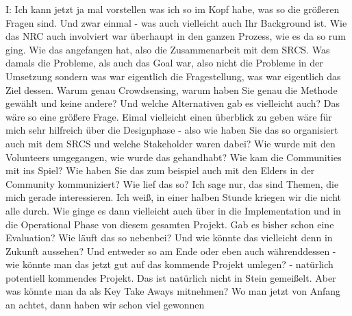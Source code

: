 I: Ich kann jetzt ja mal vorstellen was ich so im Kopf habe, was so die gr{\"o}ßeren Fragen sind. Und zwar einmal - was auch vielleicht auch Ihr Background ist. Wie das NRC auch involviert war {\"u}berhaupt in den ganzen Prozess, wie es da so rum ging. Wie das angefangen hat, also die Zusammenarbeit mit dem SRCS. Was damals die Probleme, als auch das Goal war, also nicht die Probleme in der Umsetzung sondern was war eigentlich die Fragestellung, was war eigentlich das Ziel dessen. Warum genau Crowdsensing, warum haben Sie genau die Methode gew{\"a}hlt und keine andere? Und welche Alternativen gab es vielleicht auch? Das w{\"a}re so eine gr{\"o}ßere Frage. Eimal vielleicht einen {\"u}berblick zu geben w{\"a}re f{\"u}r mich sehr hilfreich {\"u}ber die Designphase - also wie haben Sie das so organisiert auch mit dem SRCS und welche Stakeholder waren dabei? Wie wurde mit den Volunteers umgegangen, wie wurde das gehandhabt? Wie kam die Communities mit ins Spiel? Wie haben Sie das zum beispiel auch mit den Elders in der Community kommuniziert? Wie lief das so? Ich sage nur, das sind Themen, die mich gerade interessieren. Ich weiß, in einer halben Stunde kriegen wir die nicht alle durch. Wie ginge es dann vielleicht auch {\"u}ber in die Implementation und in die Operational Phase von diesem gesamten Projekt. Gab es bisher schon eine Evaluation? Wie l{\"a}uft das so nebenbei? Und wie k{\"o}nnte das vielleicht denn in Zukunft aussehen? Und entweder so am Ende oder eben auch w{\"a}hrenddessen - wie k{\"o}nnte man das jetzt gut auf das kommende Projekt umlegen? - nat{\"u}rlich potentiell kommendes Projekt. Das ist nat{\"u}rlich nicht in Stein gemeißelt. Aber was k{\"o}nnte man da als Key Take Aways mitnehmen? Wo man jetzt von Anfang an achtet, dann  haben wir schon viel gewonnen

